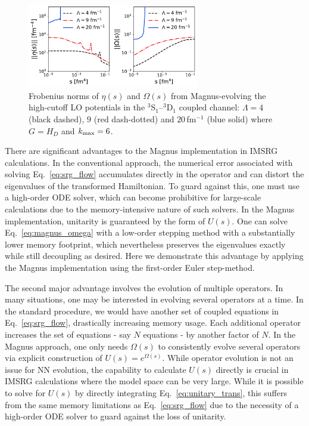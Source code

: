 \documentclass[10pt,aps,prc,floatfix,twocolumn,nofootinbib]{revtex4-1}
\begin{document}
%
\begin{figure}[tbh]
	\includegraphics[clip,width=0.67\textwidth]{eta_omega_norms_kvnns_900_901_902_3S1_Wegner_k_magnus_6_ds1,0e-05.pdf}%
	\caption{Frobenius norms of $\eta(s)$ and $\Omega(s)$ from Magnus-evolving the high-cutoff LO potentials in the $^3$S$_1$--$^3$D$_1$ coupled channel: $\Lambda=4$ (black dashed), $9$ (red dash-dotted) and $20$\,fm$^{-1}$ (blue solid) where $G=H_D$ and $k_{\rm max}=6$.}
	\label{fig:eta_omega_norms}
\end{figure}
%

There are significant advantages to the Magnus implementation in IMSRG calculations.
In the conventional approach, the numerical error associated with solving Eq.~\eqref{eq:srg_flow} accumulates directly in the operator and can distort the eigenvalues of the transformed Hamiltonian.
To guard against this, one must use a high-order ODE solver, which can become prohibitive for large-scale calculations due to the memory-intensive nature of such solvers.  
In the Magnus implementation, unitarity is guaranteed by the form of $U(s)$.
One can solve Eq.~\eqref{eq:magnus_omega} with a low-order stepping method with a substantially lower memory footprint, which nevertheless preserves the eigenvalues exactly while still decoupling as desired.
Here we demonstrate this advantage by applying the Magnus implementation using the first-order Euler step-method.


The second major advantage involves the evolution of multiple operators.
In many situations, one may be interested in evolving several operators at a time.
In the standard procedure, we would have another set of coupled equations in Eq.~\eqref{eq:srg_flow}, drastically increasing memory usage.
Each additional operator increases the set of equations - say $N$ equations - by another factor of $N$.
In the Magnus approach, one only needs $\Omega(s)$ to consistently evolve several operators via explicit construction of $U(s)=e^{\Omega(s)}$.
While operator evolution is not an issue for NN evolution, the capability to calculate $U(s)$ directly is crucial in IMSRG calculations where the model space can be very large.
While it is possible to solve for $U(s)$ by directly integrating Eq.~\eqref{eq:unitary_trans}, this suffers from the same memory limitations as Eq.~\eqref{eq:srg_flow} due to the necessity of a high-order ODE solver to guard against the loss of unitarity.
\end{document}
